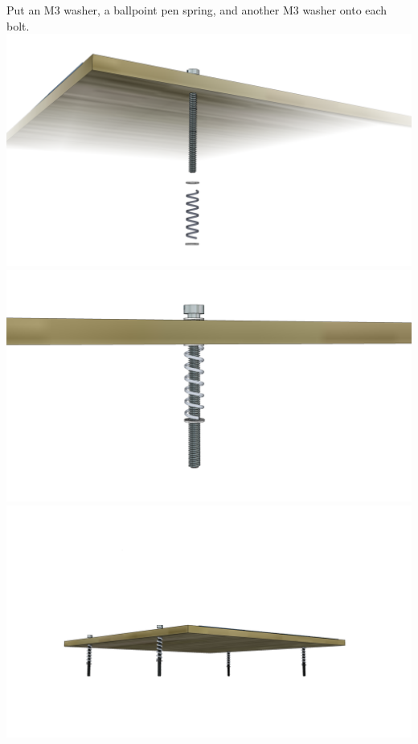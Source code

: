 \documentclass[twoside,openany,a4paper,titlepage]{memoir}
\begin{document}
	\section{}
	Put an M3 washer, a ballpoint pen spring, and another M3 washer onto each bolt.\\
	\includegraphics[width=1\linewidth]{graphics/ch11_4_1.png}
	\includegraphics[width=1\linewidth]{graphics/ch11_4_2.png}
	\includegraphics[width=1\linewidth]{graphics/ch11_4_3.png}
	
\end{document}
